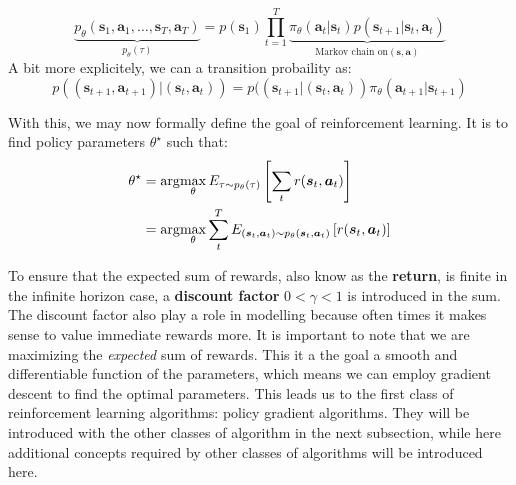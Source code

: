 \begin{equation}
\underbrace{p_\theta(\bm{s}_1, \bm{a}_1, \dots, \bm{s}_T, \bm{a}_T)}_{p_\theta(\tau)} = p(\bm{s}_1) \prod^{T}_{t=1} 
\underbrace{\pi_{\theta} (\bm{a}_t | \bm{s}_t) p (\bm{s}_{t+1} | \bm{s}_t, \bm{a}_t)}_{\text{Markov chain on} (\bm{s}, \bm{a})}
\end{equation}
A bit more explicitely, we can a transition probaility as:
\begin{equation}
p((\bm{s}_{t+1}, \bm{a}_{t+1}) | (\bm{s}_t, \bm{a}_t)) = 
p((\bm{s}_{t+1}| (\bm{s}_t, \bm{a}_t)) \pi_\theta (\bm{a}_{t+1} | \bm{s}_{t+1})
\end{equation}

With this, we may now formally define the goal of reinforcement learning.
It is to find policy parameters $ \theta^{ \star }  $ such that:
\begin{align}
		\theta^\star &= \arg\!\max_{\theta} E_{\tau \sim p_\theta(\tau)} \left[ \sum_{t}^{} r(\bm{s}_t, \bm{a}_t) \right] \\
	 &= \arg\!\max_{\theta} \sum_{t}^{T} E_{(\bm{s}_t, \bm{a}_t) \sim p_\theta(\bm{s}_t, \bm{a}_t)} \left[  r(\bm{s}_t, \bm{a}_t) \right]
\end{align}

To ensure that the expected sum of rewards, also know as the \textbf{return},
is finite in the infinite horizon case, a
\textbf{discount factor} $ 0 < \gamma < 1  $ is introduced in the sum.
The discount factor also play a role in modelling 
because often times it makes sense to value immediate rewards
more.
It is important to note that we are maximizing the \textit{expected} sum of
rewards. This it a the goal a smooth and differentiable function of the parameters,
which means we can employ gradient descent to find the optimal parameters.
This leads us to the first class of reinforcement learning algorithms:
policy gradient algorithms.
They will be introduced with the other classes of algorithm in the next subsection,
while here additional concepts required by other classes of algorithms will be introduced here.


